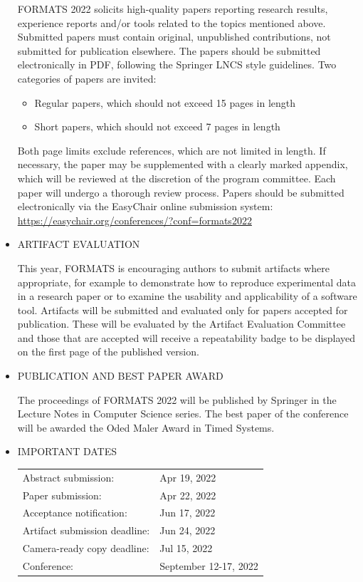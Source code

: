 \documentclass[prodmode,acmtecs]{acmsmall} %
\begin{document}
\begin{itemize}
  FORMATS 2022 solicits high-quality papers reporting research results, experience reports and/or tools related to the topics mentioned above. Submitted papers must contain original, unpublished contributions, not submitted for publication elsewhere. The papers should be submitted electronically in PDF, following the Springer LNCS style guidelines. Two categories of papers are invited: 
 
\begin{itemize}\item  Regular papers, which should not exceed 15 pages in length
\item  Short papers, which should not exceed 7 pages in length
\end{itemize} 
  Both page limits exclude references, which are not limited in length. If necessary, the paper may be supplemented with a clearly marked appendix, which will be reviewed at the discretion of the program committee. Each paper will undergo a thorough review process. Papers should be submitted electronically via the EasyChair online submission system: \href{https://easychair.org/conferences/?conf=formats2022}{https://easychair.org/conferences/?conf=formats2022}  
 
\item  ARTIFACT EVALUATION 
 
  This year, FORMATS is encouraging authors to submit artifacts where appropriate, for example to demonstrate how to reproduce experimental data in a research paper or to examine the usability and applicability of a software tool. Artifacts will be submitted and evaluated only for papers accepted for publication. These will be evaluated by the Artifact Evaluation Committee and those that are accepted will receive a repeatability badge to be displayed on the first page of the published version. 
 
\item  PUBLICATION AND BEST PAPER AWARD 
 
  The proceedings of FORMATS 2022 will be published by Springer in the Lecture Notes in Computer Science series. The best paper of the conference will be awarded the Oded Maler Award in Timed Systems. 
 
\item  IMPORTANT DATES 
 
\begin{tabulary}{\linewidth}{LL}Abstract submission:  & Apr 19, 2022 \\
Paper submission:  & Apr 22, 2022 \\
Acceptance notification:  & Jun 17, 2022 \\
Artifact submission deadline:  & Jun 24, 2022 \\
Camera-ready copy deadline:  & Jul 15, 2022 \\
Conference:  & September 12-17, 2022 \\
\end{tabulary}
 

\end{itemize}
\end{document}
